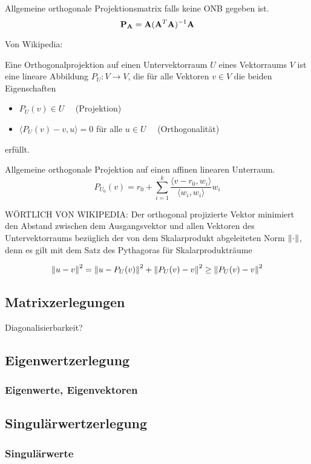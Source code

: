 Allgemeine orthogonale Projektionsmatrix falls keine ONB gegeben ist.
$$\mathbf{P}_{\mathbf{A}} = \mathbf{A} (\mathbf{A}^T \mathbf{A})^{-1} \mathbf{A}$$

Von Wikipedia:
\begin{defn}
Eine Orthogonalprojektion auf einen Untervektorraum $U$ eines Vektorraums $V$ ist eine lineare Abbildung $P_U \colon V \rightarrow V$, die für alle Vektoren $v\in V$ die beiden Eigenschaften

\begin{itemize}
\item $P_U(v) \in U \quad$   (Projektion)
\item $\langle P_U(v) - v , u \rangle = 0$ für alle $u \in U \quad$ (Orthogonalität)
\end{itemize}
erfüllt.
\end{defn}

Allgemeine orthogonale Projektion auf einen affinen linearen Unterraum.
$$P_{U_0}(v) = r_0 + \sum_{i=1}^k \frac{\langle v - r_0, w_i \rangle}{\langle w_i, w_i \rangle} w_i$$

WÖRTLICH VON WIKIPEDIA:
Der orthogonal projizierte Vektor minimiert den Abstand zwischen dem Ausgangsvektor und allen Vektoren des Untervektorraums bezüglich der von dem Skalarprodukt abgeleiteten Norm $\left\lVert \cdot \right\rVert$, denn es gilt mit dem Satz des Pythagoras für Skalarprodukträume

$$\left\lVert u - v \right\rVert^2 = \left\lVert u - P_U(v) \right\rVert^2 + \left\lVert P_U(v) - v \right\rVert^2 \geq \left\lVert P_U(v) - v \right\rVert^2$$

\subsection{Matrixzerlegungen}

Diagonalisierbarkeit?

\subsection{Eigenwertzerlegung}
\subsubsection{Eigenwerte, Eigenvektoren}
\subsection{Singulärwertzerlegung}
\subsubsection{Singulärwerte}

